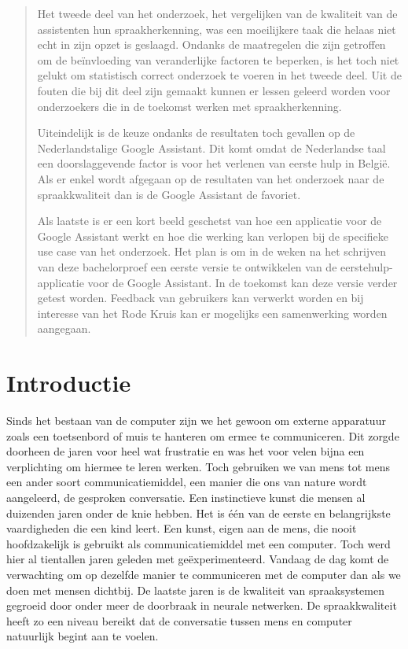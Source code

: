 \documentclass[a0,portrait]{a0poster}
\begin{document}
\begin{multicols}{2}
\begin{abstract}
Het tweede deel van het onderzoek, het vergelijken van de kwaliteit van de assistenten hun spraakherkenning, was een moeilijkere taak die helaas niet echt in zijn opzet is geslaagd. Ondanks de maatregelen die zijn getroffen om de beïnvloeding van veranderlijke factoren te beperken, is het toch niet gelukt om statistisch correct onderzoek te voeren in het tweede deel. Uit de fouten die bij dit deel zijn gemaakt kunnen er lessen geleerd worden voor onderzoekers die in de toekomst werken met spraakherkenning.

Uiteindelijk is de keuze ondanks de resultaten toch gevallen op de Nederlandstalige Google Assistant. Dit komt omdat de Nederlandse taal een doorslaggevende factor is voor het verlenen van eerste hulp in België. Als er enkel wordt afgegaan op de resultaten van het onderzoek naar de spraakkwaliteit dan is de Google Assistant de favoriet.

Als laatste is er een kort beeld geschetst van hoe een applicatie voor de Google Assistant werkt en hoe die werking kan verlopen bij de specifieke use case van het onderzoek. Het plan is om in de weken na het schrijven van deze bachelorproef een eerste versie te ontwikkelen van de eerstehulp-applicatie voor de Google Assistant. In de toekomst kan deze versie verder getest worden. Feedback van gebruikers kan verwerkt worden en bij interesse van het Rode Kruis kan er mogelijks een samenwerking worden aangegaan.
\end{abstract}

\color{HoGentAccent1} 
\section*{Introductie}
\color{black}
\color{black}
Sinds het bestaan van de computer zijn we het gewoon om externe apparatuur zoals een toetsenbord of muis te hanteren om ermee te communiceren. Dit zorgde doorheen de jaren voor heel wat frustratie en was het voor velen bijna een verplichting om hiermee te leren werken. Toch gebruiken we van mens tot mens een ander soort communicatiemiddel, een manier die ons van nature wordt aangeleerd, de gesproken conversatie.
Een instinctieve kunst die mensen al duizenden jaren onder de knie hebben. Het is één van de eerste en belangrijkste vaardigheden die een kind leert. Een kunst, eigen aan de mens, die nooit hoofdzakelijk is gebruikt als communicatiemiddel met een computer. Toch werd hier al tientallen jaren geleden met geëxperimenteerd. Vandaag de dag komt de verwachting om op dezelfde manier te communiceren met de computer dan als we doen met mensen dichtbij. De laatste jaren is de kwaliteit van spraaksystemen gegroeid door onder meer de doorbraak in neurale netwerken. De spraakkwaliteit heeft zo een niveau bereikt dat de conversatie tussen mens en computer natuurlijk begint aan te voelen.


\end{multicols}
\end{document}
